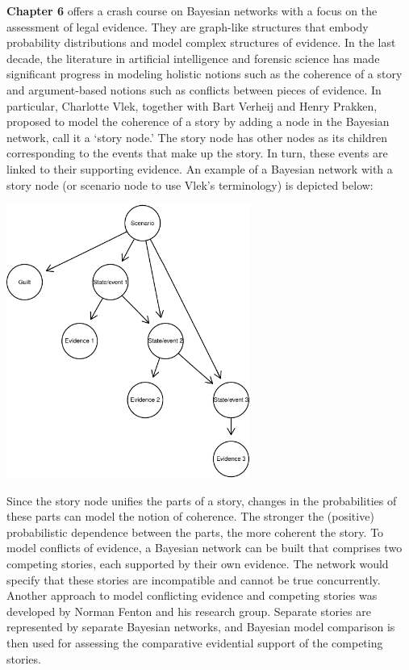 \documentclass[
  10pt,
  dvipsnames,enabledeprecatedfontcommands]{scrartcl}
\begin{document}
\textbf{Chapter 6} offers a crash course on Bayesian networks with a
focus on the assessment of legal evidence. They are graph-like
structures that embody probability distributions and model complex
structures of evidence. In the last decade, the literature in artificial
intelligence and forensic science has made significant progress in
modeling holistic notions such as the coherence of a story and
argument-based notions such as conflicts between pieces of evidence. In
particular, Charlotte Vlek, together with Bart Verheij and Henry
Prakken, proposed to model the coherence of a story by adding a node in
the Bayesian network, call it a `story node.' The story node has other
nodes as its children corresponding to the events that make up the
story. In turn, these events are linked to their supporting evidence. An
example of a Bayesian network with a story node (or scenario node to use
Vlek's terminology) is depicted below:

\vspace{-2mm}

\begin{center}
\includegraphics[width=8cm]{vlek-scenario-node.pdf}
 \end{center}

\vspace{-2mm}

\noindent Since the story node unifies the parts of a story, changes in
the probabilities of these parts can model the notion of coherence. The
stronger the (positive) probabilistic dependence between the parts, the
more coherent the story. To model conflicts of evidence, a Bayesian
network can be built that comprises two competing stories, each
supported by their own evidence. The network would specify that these
stories are incompatible and cannot be true concurrently. Another
approach to model conflicting evidence and competing stories was
developed by Norman Fenton and his research group. Separate stories are
represented by separate Bayesian networks, and Bayesian model comparison
is then used for assessing the comparative evidential support of the
competing stories.
\end{document}
